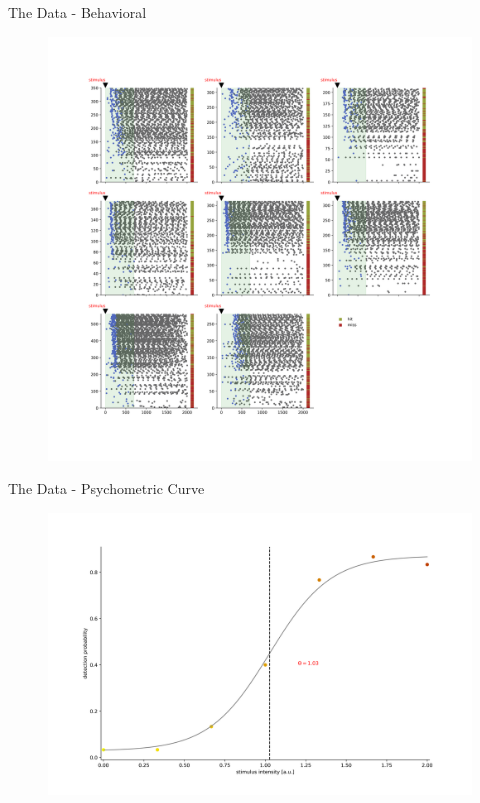 \documentclass[10pt]{beamer}
\begin{document}
\begin{frame}[fragile]{The Data - Behavioral}
	\begin{center}
	\begin{figure}
      \includegraphics[scale=0.23	]{lickplots.png}
	\end{figure}
	\end{center}
\end{frame}

\begin{frame}[fragile]{The Data - Psychometric Curve}
\begin{center}
	\begin{figure}
      \includegraphics[scale=0.38]{psychometric.png}
	\end{figure}
	\end{center}
	
\end{frame}
\end{document}

